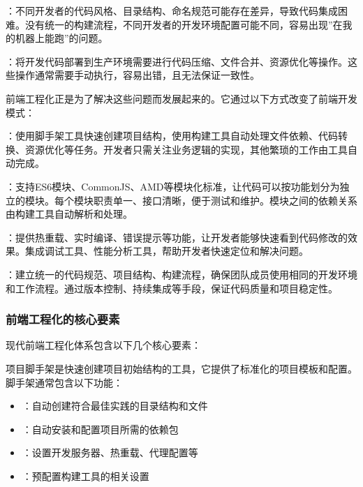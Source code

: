 ：不同开发者的代码风格、目录结构、命名规范可能存在差异，导致代码集成困难。没有统一的构建流程，不同开发者的开发环境配置可能不同，容易出现''在我的机器上能跑''的问题。

：将开发代码部署到生产环境需要进行代码压缩、文件合并、资源优化等操作。这些操作通常需要手动执行，容易出错，且无法保证一致性。

前端工程化正是为了解决这些问题而发展起来的。它通过以下方式改变了前端开发模式：

：使用脚手架工具快速创建项目结构，使用构建工具自动处理文件依赖、代码转换、资源优化等任务。开发者只需关注业务逻辑的实现，其他繁琐的工作由工具自动完成。

：支持ES6模块、CommonJS、AMD等模块化标准，让代码可以按功能划分为独立的模块。每个模块职责单一、接口清晰，便于测试和维护。模块之间的依赖关系由构建工具自动解析和处理。

：提供热重载、实时编译、错误提示等功能，让开发者能够快速看到代码修改的效果。集成调试工具、性能分析工具，帮助开发者快速定位和解决问题。

：建立统一的代码规范、项目结构、构建流程，确保团队成员使用相同的开发环境和工作流程。通过版本控制、持续集成等手段，保证代码质量和项目稳定性。

\hypertarget{ux524dux7aefux5de5ux7a0bux5316ux7684ux6838ux5fc3ux8981ux7d20}{%
\subsubsection{前端工程化的核心要素}\label{ux524dux7aefux5de5ux7a0bux5316ux7684ux6838ux5fc3ux8981ux7d20}}

现代前端工程化体系包含以下几个核心要素：


项目脚手架是快速创建项目初始结构的工具，它提供了标准化的项目模板和配置。脚手架通常包含以下功能：

\begin{itemize}
\tightlist
\item
  ：自动创建符合最佳实践的目录结构和文件
\item
  ：自动安装和配置项目所需的依赖包
\item
  ：设置开发服务器、热重载、代理配置等
\item
  ：预配置构建工具的相关设置
\end{itemize}

